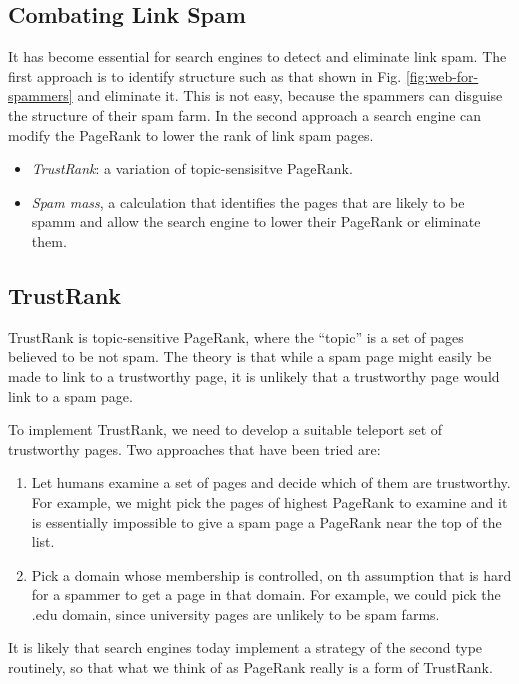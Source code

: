 \subsection{Combating Link Spam}\label{subsec:combating-link-spam}

It has become essential for search engines to detect and eliminate link spam. The first approach is to identify structure such as that shown in Fig. \ref{fig:web-for-spammers} and eliminate it. This is not easy, because the spammers can disguise the structure of their spam farm. In the second approach a search engine can modify the PageRank to lower the rank of link spam pages. 
\begin{itemize}
    \item \textit{TrustRank}: a variation of topic-sensisitve PageRank.
    \item \textit{Spam mass}, a calculation that identifies the pages that are likely to be spamm and allow the search engine to lower their PageRank or eliminate them.
\end{itemize}

\subsection{TrustRank}\label{subsec:trust-rank}

TrustRank is topic-sensitive PageRank, where the ``topic'' is a set of pages believed to be not spam. The theory is that while a spam page might easily be made to link to a trustworthy page, it is unlikely that a trustworthy page would link to a spam page.

To implement TrustRank, we need to develop a suitable teleport set of trustworthy pages. Two approaches that have been tried are:

\begin{enumerate}
    \item Let humans examine a set of pages and decide which of them are trustworthy. For example, we might pick the pages of highest PageRank to examine and it is essentially impossible to give a spam page a PageRank near the top of the list. 
    \item Pick a domain whose membership is controlled, on th assumption that is hard for a spammer to get a page in that domain. For example, we could pick the .edu domain, since university pages are unlikely to be spam farms.
\end{enumerate}

It is likely that search engines today implement a strategy of the second type routinely, so that what we think of as PageRank really is a form of TrustRank.


